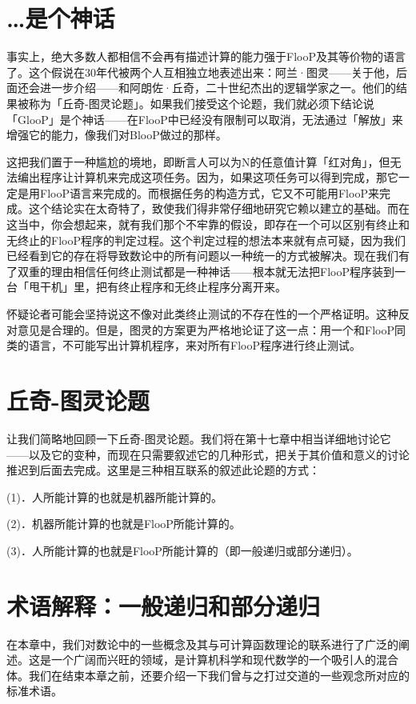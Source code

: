 \documentclass[
  12pt,
  twoside,
  openright,
  oldfontcommands,
]{memoir}
\begin{document}
\section{\ldots 是个神话}

事实上，绝大多数人都相信不会再有描述计算的能力强于FlooP及其等价物的语言了。这个假说在30年代被两个人互相独立地表述出来：阿兰·图灵------关于他，后面还会进一步介绍------和阿朗佐·丘奇，二十世纪杰出的逻辑学家之一。他们的结果被称为「丘奇-图灵论题」。如果我们接受这个论题，我们就必须下结论说「GlooP」是个神话------在FlooP中已经没有限制可以取消，无法通过「解放」来增强它的能力，像我们对BlooP做过的那样。

这把我们置于一种尴尬的境地，即断言人可以为N的任意值计算「红对角」，但无法编出程序让计算机来完成这项任务。因为，如果这项任务可以得到完成，那它一定是用FlooP语言来完成的。而根据任务的构造方式，它又不可能用FlooP来完成。这个结论实在太奇特了，致使我们得非常仔细地研究它赖以建立的基础。而在这当中，你会想起来，就有我们那个不牢靠的假设，即存在一个可以区别有终止和无终止的FlooP程序的判定过程。这个判定过程的想法本来就有点可疑，因为我们已经看到它的存在将导致数论中的所有问题以一种统一的方式被解决。现在我们有了双重的理由相信任何终止测试都是一种神话------根本就无法把FlooP程序装到一台「甩干机」里，把有终止程序和无终止程序分离开来。

怀疑论者可能会坚持说这不像对此类终止测试的不存在性的一个严格证明。这种反对意见是合理的。但是，图灵的方案更为严格地论证了这一点：用一个和FlooP同类的语言，不可能写出计算机程序，来对所有FlooP程序进行终止测试。

\section{丘奇-图灵论题}

让我们简略地回顾一下丘奇-图灵论题。我们将在第十七章中相当详细地讨论它------以及它的变种，而现在只需要叙述它的几种形式，把关于其价值和意义的讨论推迟到后面去完成。这里是三种相互联系的叙述此论题的方式：

(1)．人所能计算的也就是机器所能计算的。

(2)．机器所能计算的也就是FlooP所能计算的。

(3)．人所能计算的也就是FlooP所能计算的（即一般递归或部分递归）。

\section{术语解释：一般递归和部分递归}

在本章中，我们对数论中的一些概念及其与可计算函数理论的联系进行了广泛的阐述。这是一个广阔而兴旺的领域，是计算机科学和现代数学的一个吸引人的混合体。我们在结束本章之前，还要介绍一下我们曾与之打过交道的一些观念所对应的标准术语。
\end{document}
